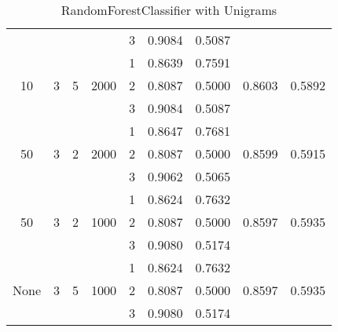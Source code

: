 \documentclass[12pt, twoside]{article}
\begin{document}
\begin{landscape}
\begin{table}[!htbp]
\begin{tabular}{ccccccccc}
  	&	&	&	&	3	&	0.9084	&	0.5087	&		&	 \\
  	\cmidrule(r){5-9}
  	&	&	&	&	1	&	0.8639	&	0.7591	&		&	 \\
  10	&	3	&	5	&	2000	&	2	&	0.8087	&	0.5000	&	0.8603	&	0.5892 \\
  	&	&	&	&	3	&	0.9084	&	0.5087	&		&	 \\
  	\cmidrule(r){5-9}
  	&	&	&	&	1	&	0.8647	&	0.7681	&		&	 \\
  50	&	3	&	2	&	2000	&	2	&	0.8087	&	0.5000	&	0.8599	&	0.5915 \\
  	&	&	&	&	3	&	0.9062	&	0.5065	&		&	 \\
  	\cmidrule(r){5-9}
  	&	&	&	&	1	&	0.8624		&	0.7632	&		&	 \\
  50	&	3	&	2	&	1000	&	2	&	0.8087	&	0.5000	&	0.8597	&	0.5935 \\
  	&	&	&	&	3	&	0.9080	&	0.5174	&		&	 \\
  	\cmidrule(r){5-9}
  	&	&	&	&	1	&	0.8624	&	0.7632	&		&	 \\
  None	&	3	&	5	&	1000	&	2	&	0.8087	&	0.5000	&	0.8597	&	0.5935 \\
  	&	&	&	&	3	&	0.9080	&	0.5174	&		&	 \\
  \bottomrule
  \end{tabular}
  \caption{RandomForestClassifier with Unigrams}
\end{table}
\end{landscape}
\end{document}

